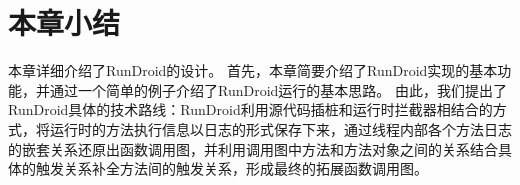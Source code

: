  \section{本章小结}

本章详细介绍了RunDroid的设计。
首先，本章简要介绍了RunDroid实现的基本功能，并通过一个简单的例子介绍了RunDroid运行的基本思路。
由此，我们提出了RunDroid具体的技术路线：RunDroid利用源代码插桩和运行时拦截器相结合的方式，将运行时的方法执行信息以日志的形式保存下来，通过线程内部各个方法日志的嵌套关系还原出函数调用图，并利用调用图中方法和方法对象之间的关系结合具体的触发关系补全方法间的触发关系，形成最终的拓展函数调用图。
